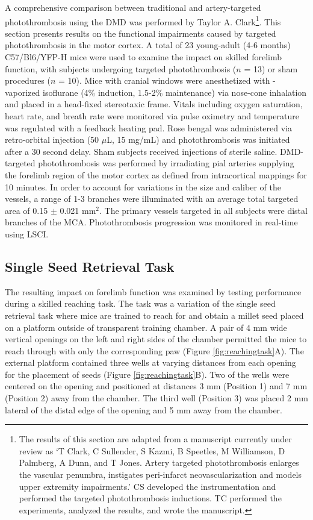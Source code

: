 A comprehensive comparison between traditional and artery-targeted photothrombosis using the DMD was performed by Taylor A. Clark\footnote{The results of this section are adapted from a manuscript currently under review as `T Clark, C Sullender, S Kazmi, B Speetles, M Williamson, D Palmberg, A Dunn, and T Jones. Artery targeted photothrombosis enlarges the vascular penumbra, instigates peri-infarct neovascularization and models upper extremity impairments.' CS developed the instrumentation and performed the targeted photothrombosis inductions. TC performed the experiments, analyzed the results, and wrote the manuscript.}. This section presents results on the functional impairments caused by targeted photothrombosis in the motor cortex. A total of 23 young-adult (4-6 months) C57/Bl6/YFP-H mice were used to examine the impact on skilled forelimb function, with subjects undergoing targeted photothrombosis ($n$ = 13) or sham procedures ($n$ = 10). Mice with cranial windows were anesthetized with -vaporized isoflurane (4\% induction, 1.5-2\% maintenance) via nose-cone inhalation and placed in a head-fixed stereotaxic frame. Vitals including oxygen saturation, heart rate, and breath rate were monitored via pulse oximetry and temperature was regulated with a feedback heating pad. Rose bengal was administered via retro-orbital injection (50 $\mu$L, 15 mg/mL) and photothrombosis was initiated after a 30 second delay. Sham subjects received injections of sterile saline. DMD-targeted photothrombosis was performed by irradiating pial arteries supplying the forelimb region of the motor cortex as defined from intracortical mappings \cite{Tennant:2011cx} for 10 minutes. In order to account for variations in the size and caliber of the vessels, a range of 1-3 branches were illuminated with an average total targeted area of 0.15 $\pm$ 0.021 mm$^2$. The primary vessels targeted in all subjects were distal branches of the MCA. Photothrombosis progression was monitored in real-time using LSCI.

\subsection{Single Seed Retrieval Task}

The resulting impact on forelimb function was examined by testing performance during a skilled reaching task. The task was a variation of the single seed retrieval task \cite{Chen:2014hy} where mice are trained to reach for and obtain a millet seed placed on a platform outside of transparent training chamber. A pair of 4 mm wide vertical openings on the left and right sides of the chamber permitted the mice to reach through with only the corresponding paw (Figure \ref{fig:reachingtask}A). The external platform contained three wells at varying distances from each opening for the placement of seeds (Figure \ref{fig:reachingtask}B). Two of the wells were centered on the opening and positioned at distances 3 mm (Position 1) and 7 mm (Position 2) away from the chamber. The third well (Position 3) was placed 2 mm lateral of the distal edge of the opening and 5 mm away from the chamber.

